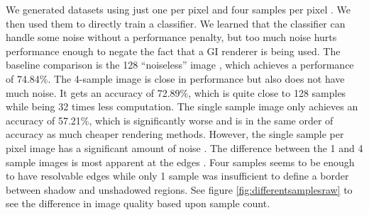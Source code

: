 We generated datasets using just one per pixel and four samples per pixel . We then used them to directly train a classifier.  We learned that the classifier can handle some noise without a performance penalty,  but too much noise hurts performance enough to negate the fact that a GI renderer is being used.  The baseline comparison is the 128 ``noiseless'' image , which achieves a performance of 74.84\%.  The 4-sample image is close in performance but also does not have much noise.  It gets an accuracy of 72.89\%, which is quite close to 128 samples while being 32 times less computation.   The single sample image only achieves an accuracy of 57.21\%, which is significantly worse and is in the same order of accuracy as much cheaper rendering methods. However, the single sample per pixel image has a significant amount of noise .  The difference between the 1 and 4 sample images is most apparent at the edges . Four samples seems to be enough to have resolvable edges while only 1 sample was insufficient to define a border between shadow and unshadowed regions. See figure \ref{fig:differentsamplesraw} to see the difference in image quality based upon sample count. 


